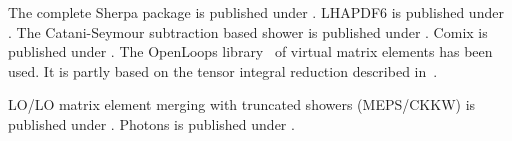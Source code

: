 \documentclass{article}
\begin{document}
The complete Sherpa package is published under \cite{Gleisberg:2008ta}.
LHAPDF6 is published under \cite{Buckley:2014ana}.
The Catani-Seymour subtraction based shower is published under \cite{Schumann:2007mg}.
Comix is published under \cite{Gleisberg:2008fv}.
The OpenLoops library~\cite{Cascioli:2011va} of virtual
matrix elements has been used. 
It is partly based on the tensor integral reduction described in~\cite{Denner:2002ii,Denner:2005nn,Denner:2010tr,Denner:2014gla}.

LO/LO matrix element merging with truncated showers (MEPS/CKKW) is published under \cite{Hoeche:2009rj}.
Photons is published under \cite{Schonherr:2008av}.
\end{document}
